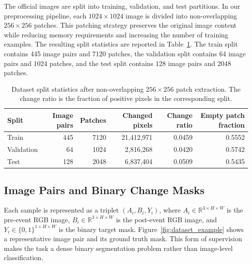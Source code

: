 \documentclass[11pt,a4paper]{article}
\begin{document}
The official images are split into training, validation, and test partitions. In our preprocessing pipeline, each $1024 \times 1024$ image is divided into non-overlapping $256 \times 256$ patches. This patching strategy preserves the original image content while reducing memory requirements and increasing the number of training examples. The resulting split statistics are reported in Table~\ref{tab:dataset_stats}. The train split contains 445 image pairs and 7120 patches, the validation split contains 64 image pairs and 1024 patches, and the test split contains 128 image pairs and 2048 patches.

\begin{table}[H]
  \centering
  \caption{Dataset split statistics after non-overlapping $256 \times 256$ patch extraction. The change ratio is the fraction of positive pixels in the corresponding split.}
  \label{tab:dataset_stats}
  \begin{tabular}{lrrrrr}
    \toprule
    Split & Image pairs & Patches & Changed pixels & Change ratio & Empty patch fraction \\
    \midrule
    Train & 445 & 7120 & 21,412,971 & 0.0459 & 0.5552 \\
    Validation & 64 & 1024 & 2,816,268 & 0.0420 & 0.5742 \\
    Test & 128 & 2048 & 6,837,404 & 0.0509 & 0.5435 \\
    \bottomrule
  \end{tabular}
\end{table}

\subsection{Image Pairs and Binary Change Masks}

Each sample is represented as a triplet $(A_i,B_i,Y_i)$, where $A_i \in \mathbb{R}^{3 \times H \times W}$ is the pre-event RGB image, $B_i \in \mathbb{R}^{3 \times H \times W}$ is the post-event RGB image, and $Y_i \in \{0,1\}^{1 \times H \times W}$ is the binary target mask. Figure~\ref{fig:dataset_example} shows a representative image pair and its ground truth mask. This form of supervision makes the task a dense binary segmentation problem rather than image-level classification.
\end{document}
